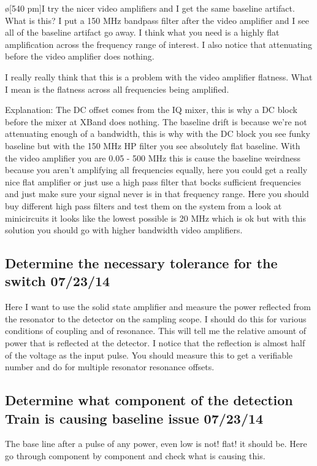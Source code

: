 \documentclass[10pt]{book}
\begin{document}
\o[540 pm]{I try the nicer video amplifiers and I get the same baseline artifact. What is this? I put a 150 MHz bandpass filter after the video amplifier and I see all of the baseline artifact go away. I think what you need is a highly flat amplification across the frequency range of interest. I also notice that attenuating before the video amplifier does nothing.}

I really really think that this is a problem with the video amplifier flatness. What I mean is the flatness across all frequencies being amplified.

Explanation: The DC offset comes from the IQ mixer, this is why a DC block before the mixer at XBand does nothing. The baseline drift is because we're not attenuating enough of a bandwidth, this is why with the DC block you see funky baseline but with the 150 MHz HP filter you see absolutely flat baseline. With the video amplifier you are 0.05 - 500 MHz this is cause the baseline weirdness because you aren't amplifying all frequencies equally, here you could get a really nice flat amplifier or just use a high pass filter that bocks sufficient frequencies and just make sure your signal never is in that frequency range.
Here you should buy different high pass filters and test them on the system from a look at minicircuits it looks like the lowest possible is 20 MHz which is ok but with this solution you should go with higher bandwidth video amplifiers.

\subsection{Determine the necessary tolerance for the switch 07/23/14}
Here I want to use the solid state amplifier and measure the power reflected from the resonator to the detector on the sampling scope. I should do this for various conditions of coupling and of resonance. This will tell me the relative amount of power that is reflected at the detector.
I notice that the reflection is almost half of the voltage as the input pulse. You should measure this to get a verifiable number and do for multiple resonator resonance offsets.

\subsection{Determine what component of the detection Train is causing baseline issue 07/23/14}
The base line after a pulse of any power, even low is not! flat! it should be. Here go through component by component and check what is causing this.
\end{document}
